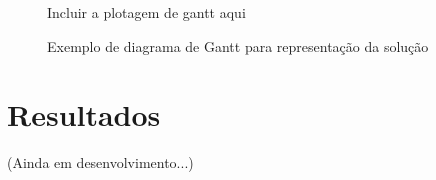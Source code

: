     \begin{figure}[h]
        \centering
        \small{Incluir a plotagem de gantt aqui}
        \caption{Exemplo de diagrama de Gantt para representação da solução}
        \label{fig:exemplo-gantt}
    \end{figure}
    


\section{Resultados}
    (Ainda em desenvolvimento...)


